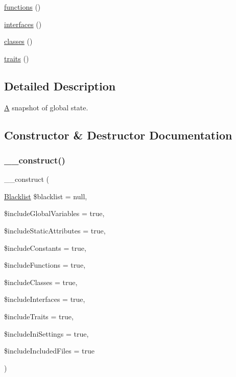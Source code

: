 \begin{DoxyCompactItemize}
\item 
\mbox{\hyperlink{class_sebastian_bergmann_1_1_global_state_1_1_snapshot_a080c9835b216730f385f2d426b560af2}{functions}} ()
\item 
\mbox{\hyperlink{class_sebastian_bergmann_1_1_global_state_1_1_snapshot_af831b98f4534ed099f13ddbf2e387bf7}{interfaces}} ()
\item 
\mbox{\hyperlink{class_sebastian_bergmann_1_1_global_state_1_1_snapshot_a0d4621fbde6e250d9475bb858b877c5e}{classes}} ()
\item 
\mbox{\hyperlink{class_sebastian_bergmann_1_1_global_state_1_1_snapshot_a7c4ffaba1f26678ced320c5787c3d590}{traits}} ()
\end{DoxyCompactItemize}


\subsection{Detailed Description}
\mbox{\hyperlink{class_a}{A}} snapshot of global state. 

\subsection{Constructor \& Destructor Documentation}
\mbox{\label{class_sebastian_bergmann_1_1_global_state_1_1_snapshot_aeb75284b36ce883a07e7905267cf2dc5}} 
\subsubsection{\texorpdfstring{\+\_\+\+\_\+construct()}{\_\_construct()}}
{\footnotesize\ttfamily \+\_\+\+\_\+construct (\begin{DoxyParamCaption}\item[{\mbox{\hyperlink{class_sebastian_bergmann_1_1_global_state_1_1_blacklist}{Blacklist}}}]{\$blacklist = {\ttfamily null},  }\item[{}]{\$include\+Global\+Variables = {\ttfamily true},  }\item[{}]{\$include\+Static\+Attributes = {\ttfamily true},  }\item[{}]{\$include\+Constants = {\ttfamily true},  }\item[{}]{\$include\+Functions = {\ttfamily true},  }\item[{}]{\$include\+Classes = {\ttfamily true},  }\item[{}]{\$include\+Interfaces = {\ttfamily true},  }\item[{}]{\$include\+Traits = {\ttfamily true},  }\item[{}]{\$include\+Ini\+Settings = {\ttfamily true},  }\item[{}]{\$include\+Included\+Files = {\ttfamily true} }\end{DoxyParamCaption})}

